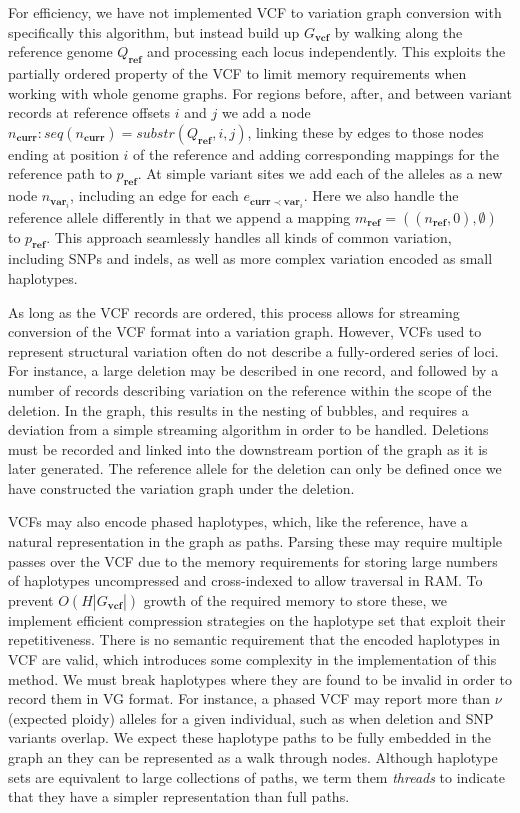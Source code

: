 For efficiency, we have not implemented VCF to variation graph conversion with specifically this algorithm, but instead build up $G_\textbf{vcf}$ by walking along the reference genome $Q_\textbf{ref}$ and processing each locus independently.
This exploits the partially ordered property of the VCF to limit memory requirements when working with whole genome graphs.
For regions before, after, and between variant records at reference offsets $i$ and $j$ we add a node $n_\textbf{curr} : seq(n_\textbf{curr}) = substr(Q_\textbf{ref}, i, j)$, linking these by edges to those nodes ending at position $i$ of the reference and adding corresponding mappings for the reference path to $p_\textbf{ref}$.
At simple variant sites we add each of the alleles as a new node $n_{\textbf{var}_i}$, including an edge for each $e_{\textbf{curr} \prec \textbf{var}_i}$.
Here we also handle the reference allele differently in that we append a mapping $m_\textbf{ref} = ((n_\textbf{ref}, 0), \emptyset)$ to $p_\textbf{ref}$.
This approach seamlessly handles all kinds of common variation, including SNPs and indels, as well as more complex variation encoded as small haplotypes.

As long as the VCF records are ordered, this process allows for streaming conversion of the VCF format into a variation graph.
However, VCFs used to represent structural variation often do not describe a fully-ordered series of loci.
For instance, a large deletion may be described in one record, and followed by a number of records describing variation on the reference within the scope of the deletion.
In the graph, this results in the nesting of bubbles, and requires a deviation from a simple streaming algorithm in order to be handled.
Deletions must be recorded and linked into the downstream portion of the graph as it is later generated.
The reference allele for the deletion can only be defined once we have constructed the variation graph under the deletion.

VCFs may also encode phased haplotypes, which, like the reference, have a natural representation in the graph as paths.
Parsing these may require multiple passes over the VCF due to the memory requirements for storing large numbers of haplotypes uncompressed and cross-indexed to allow traversal in RAM.
To prevent $O(H|G_\textbf{vcf}|)$ growth of the required memory to store these, we implement efficient compression strategies on the haplotype set that exploit their repetitiveness.
There is no semantic requirement that the encoded haplotypes in VCF are valid, which introduces some complexity in the implementation of this method.
We must break haplotypes where they are found to be invalid in order to record them in VG format.
For instance, a phased VCF may report more than $\nu$ (expected ploidy) alleles for a given individual, such as when deletion and SNP variants overlap.
We expect these haplotype paths to be fully embedded in the graph an they can be represented as a walk through nodes.
Although haplotype sets are equivalent to large collections of paths, we term them \emph{threads} to indicate that they have a simpler representation than full paths.

